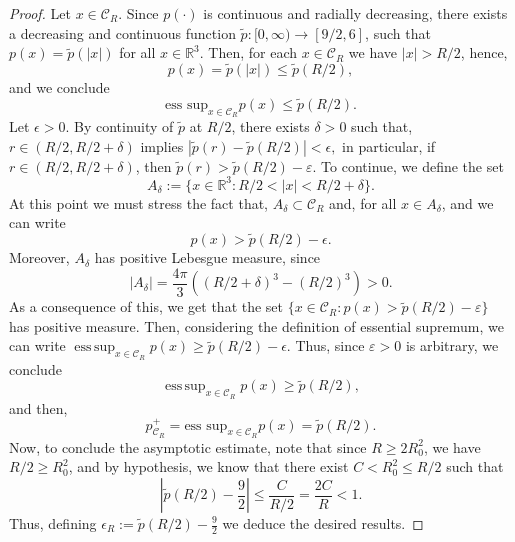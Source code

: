 \documentclass[10pt,a4paper]{amsart}
\begin{document}
\begin{proof}
Let $x\in \mathcal{C}_R$. 
Since $p(\cdot)$ is continuous and radially decreasing,  
there exists a decreasing and continuous function
$\tilde{p} : [0, \infty) \to [9/2, 6]$, 
such that $ p(x) = \tilde{p}(|x|) $ for all $ x \in \mathbb{R}^3 $.
Then, for each $ x \in \mathcal{C}_R $ we have $|x| > R/2$, hence, 
\[
p(x) = \tilde{p}(|x|) \leq \tilde{p}(R/2) %
,
\]
and we conclude 
\[
\text{ess sup}_{x \in \mathcal{C}_R} p(x) \leq  \tilde{p}(R/2) 
.
\] 
Let $ \epsilon > 0 $. By continuity of $ \tilde{p} $ at $ R/2 $, there exists $ \delta > 0 $ such that, 
$
r \in (R/2, R/2 + \delta) $ implies $|\tilde{p}(r) - \tilde{p}(R/2)| < \epsilon
,
$
in particular,  if
$
r \in (R/2, R/2 + \delta) $, then  $\tilde{p}(r) >\tilde{p}(R/2) - \varepsilon.$
To continue, we define the set
\[
A_\delta := \{x \in \mathbb{R}^3 : R/2 < |x| < R/2 + \delta\}.
\]
At this point we must stress the fact that, $ A_\delta \subset \mathcal{C}_R $ and, for all $ x \in A_\delta $, and we can write
\[
p(x) > \tilde{p}(R/2) - \epsilon.
\]
Moreover, $ A_\delta $ has positive Lebesgue measure, since
\[
| A_\delta | 
=
 \frac{4\pi}{3} ((R/2 + \delta)^3 - (R/2)^3) > 0.
\]
As a consequence of this, we get that the set $
\{x \in \mathcal{C}_R : p(x) > \tilde{p}(R/2) - \varepsilon\}$ has positive measure. Then, considering the definition of essential supremum, we can write $\operatorname{ess\,sup}_{x \in \mathcal{C}_R} p(x) \geq \tilde{p}(R/2) - \epsilon$. Thus, since  $ \varepsilon > 0 $ is arbitrary, we conclude
\[
\operatorname{ess\,sup}_{x \in \mathcal{C}_R} p(x) \geq \tilde{p}(R/2),
\]
and then, 
\[
p_{\mathcal{C}_R}^+ = \text{ess sup}_{x \in \mathcal{C}_R} p(x) =\tilde{p}(R/2).
\]
Now, to conclude  the asymptotic estimate, note that  
since $ R \geq 2R_0^2 $, we have $ R/2 \geq R_0^2 $, and by hypothesis, we know that there exist $C<R^2_0\leq R/2$ such that 
\[
\left| \tilde p(R/2) - \frac{9}{2} \right| \leq \frac{C}{R/2} = \frac{2C}{R}<1.
\]
Thus, defining %
  $\epsilon_R := \tilde p(R/2) - \frac{9}{2}$ 
 we deduce the desired results. 
\end{proof}
\end{document}
